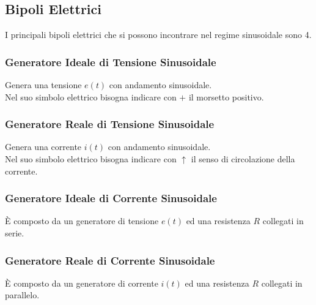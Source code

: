 \documentclass[../main.tex]{subfiles}
\begin{document}
	\subsection{Bipoli Elettrici}
	I principali bipoli elettrici che si possono incontrare nel regime sinusoidale sono 4.
	\subsubsection{Generatore Ideale di Tensione Sinusoidale}
	Genera una tensione $e(t)$ con andamento sinusoidale.\\
	Nel suo simbolo elettrico bisogna indicare con $+$ il morsetto positivo.
	\subsubsection{Generatore Reale di Tensione Sinusoidale}
	Genera una corrente $i(t)$ con andamento sinusoidale.\\
	Nel suo simbolo elettrico bisogna indicare con $\uparrow$ il senso di circolazione della corrente.
	\subsubsection{Generatore Ideale di Corrente Sinusoidale}
	È composto da un generatore di tensione $e(t)$ ed una resistenza $R$ collegati in serie.
	\subsubsection{Generatore Reale di Corrente Sinusoidale}
	È composto da un generatore di corrente $i(t)$ ed una resistenza $R$ collegati in parallelo.
\end{document}
